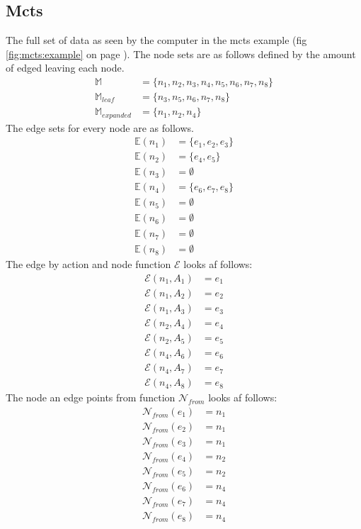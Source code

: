 \documentclass[12pt]{article}
\newcommand{\imgRef}[1]{(fig \ref{#1} on page \pageref{#1})}
\begin{document}
\subsection{Mcts}\label{mctsExampleFullData}
The full set of data as seen by the computer in the mcts example \imgRef{fig:mcts:example}. The node sets are as follows defined by the amount of edged leaving each node.
\begin{align}
 \mathbb M 										&= \{n_1, n_2, n_3, n_4, n_5, n_6, n_7, n_8\}\\
 \mathbb M_{leaf} 						&= \{n_3, n_5, n_6, n_7, n_8\}\\
 \mathbb M_{expanded} 	&= \{n_1, n_2, n_4\}
\end{align}
The edge sets for every node are as follows.
\begin{align}
 \mathbb E(n_1) &= \{e_1, e_2, e_3\}\\
 \mathbb E(n_2) &= \{e_4, e_5\}\\
 \mathbb E(n_3) &= \emptyset\\
 \mathbb E(n_4) &= \{e_6, e_7, e_8\}\\
 \mathbb E(n_5) &= \emptyset\\
 \mathbb E(n_6) &= \emptyset\\
 \mathbb E(n_7) &= \emptyset\\
 \mathbb E(n_8) &= \emptyset
\end{align}
The edge by action and node function \(\mathcal E\) looks af follows:
\begin{align}
   \mathcal E(n_1, A_1) &= e_1\\
	\mathcal E(n_1, A_2) &= e_2\\
	\mathcal E(n_1, A_3) &= e_3\\
	\mathcal E(n_2, A_4) &= e_4\\
	\mathcal E(n_2, A_5) &= e_5\\
	\mathcal E(n_4, A_6) &= e_6\\
	\mathcal E(n_4, A_7) &= e_7\\
	\mathcal E(n_4, A_8) &= e_8
\end{align}
The node an edge points from function \(\mathcal N_{from}\) looks af follows:
\begin{align}
	\mathcal N_{from} (e_1) &= n_1\\
	\mathcal N_{from} (e_2) &= n_1\\
	\mathcal N_{from} (e_3) &= n_1\\
	\mathcal N_{from} (e_4) &= n_2\\
	\mathcal N_{from} (e_5) &= n_2\\
	\mathcal N_{from} (e_6) &= n_4\\
	\mathcal N_{from} (e_7) &= n_4\\
	\mathcal N_{from} (e_8) &= n_4
\end{align}
\end{document}
